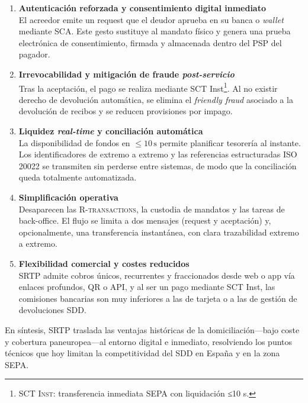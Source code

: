 \begin{enumerate}[label=\alph*)]
  \item \textbf{Autenticación reforzada y consentimiento digital inmediato}\\
        El acreedor emite un request que el deudor aprueba en su banca o \emph{wallet} mediante \textsc{SCA}. Este gesto sustituye al mandato físico y genera una prueba electrónica de consentimiento, firmada y almacenada dentro del PSP del pagador.

  \item \textbf{Irrevocabilidad y mitigación de fraude \emph{post-servicio}}\\
        Tras la aceptación, el pago se realiza mediante SCT Inst\footnote{\textsc{SCT Inst}: transferencia inmediata SEPA con liquidación ≤10 s.}. Al no existir derecho de devolución automática, se elimina el \emph{friendly fraud} asociado a la devolución de recibos y se reducen provisiones por impago.

  \item \textbf{Liquidez \emph{real-time} y conciliación automática}\\
        La disponibilidad de fondos en \(\leq10\,\text{s}\) permite planificar tesorería al instante. Los identificadores de extremo a extremo y las referencias estructuradas ISO 20022 se transmiten sin perderse entre sistemas, de modo que la conciliación queda totalmente automatizada.

  \item \textbf{Simplificación operativa}\\
        Desaparecen las \textsc{R-transactions}, la custodia de mandatos y las tareas de back-office. El flujo se limita a dos mensajes (request y aceptación) y, opcionalmente, una transferencia instantánea, con clara trazabilidad extremo a extremo.

  \item \textbf{Flexibilidad comercial y costes reducidos}\\
        SRTP admite cobros únicos, recurrentes y fraccionados desde web o app vía enlaces profundos, QR o API, y al ser un pago mediante SCT Inst, las comisiones bancarias son muy inferiores a las de tarjeta o a las de gestión de devoluciones SDD.
\end{enumerate}

En síntesis, SRTP traslada las ventajas históricas de la domiciliación—bajo coste y cobertura paneuropea—al entorno digital e inmediato, resolviendo los puntos técnicos que hoy limitan la competitividad del SDD en España y en la zona SEPA.
\vspace{0.5cm}

